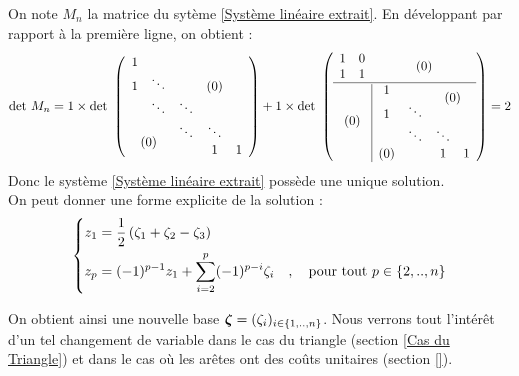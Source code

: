 On note $M_n$ la matrice du sytème \ref{Système linéaire extrait}. En développant par rapport à la première ligne, on obtient :
\begin{gather*}
  \mbox{det }M_n =
  1 \times \mbox{det } \left(
  \begin{array}{ccccc}
    1 &                                         &        &        &   \\
    1 & \ddots                                  &        & (0)    &   \\
      & \ddots                                  & \ddots &        &   \\
    \multicolumn{2}{c}{\multirow{2}{*}{ (0) }}  & \ddots & \ddots &   \\
    \multicolumn{2}{c}{}                        &        & 1      & 1
  \end{array} \right)
  + 1 \times \mbox{det } \left(
  \begin{array}{cc|cccc}
    1 & 0                                       & \multicolumn{4}{c}{\multirow{2}{*}{ (0) }} \\
    1 & 1                                       & \multicolumn{4}{c}{}                       \\
    \hline
    \multicolumn{2}{c|}{\multirow{5}{*}{ (0) }} & 1   &        & \multicolumn{2}{c}{\multirow{2}{*}{ (0) }} \\
    \multicolumn{2}{c|}{}                       & 1   & \ddots & \multicolumn{2}{c}{}                       \\
    \multicolumn{2}{c|}{}                       &     & \ddots & \ddots &                                   \\
    \multicolumn{2}{c|}{}                       & (0) &        & 1      & 1
  \end{array} \right)
  = 2
\end{gather*}
Donc le système \ref{Système linéaire extrait} possède une unique solution.
\\

On peut donner une forme explicite de la solution :
\begin{equation}
  \left\{
  \begin{aligned}\notag
    z_1 &= \frac{1}{2}\left(\zeta_1 + \zeta_2 - \zeta_3\right) \\
    z_p &= (-1)^{p-1} z_1 + \sum_{i=2}^p (-1)^{p-i}\zeta_i \quad , \quad \mbox{pour tout } p \in \{2,..,n\}
  \end{aligned}
  \right.
\end{equation}

On obtient ainsi une nouvelle base $\boldsymbol{\zeta} = (\zeta_i)_{i \in \{1,..,n\}}$. Nous verrons tout l'intérêt d'un tel changement de variable dans le cas du triangle (section \ref{Cas du Triangle}) et dans le cas où les arêtes ont des coûts unitaires (section \ref{}).
